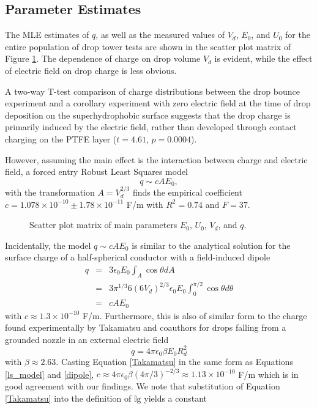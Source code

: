 \documentclass[aip,reprint, floatfix]{revtex4-1}
\begin{document}
\subsection{Parameter Estimates}
The MLE estimates of $q$, as well as the measured values of $V_d$, $E_0$, and $U_0$ for the entire population of drop tower tests are shown in the scatter plot matrix of Figure \ref{fig:scatter}. The dependence of charge on drop volume $V_d$ is evident, while the effect of electric field on drop charge is less obvious.

A two-way T-test comparison of charge distributions between the drop bounce experiment and a corollary experiment with zero electric field at the time of drop deposition on the superhydrophobic surface suggests that the drop charge is primarily induced by the electric field, rather than developed through contact charging on the PTFE layer ($t = 4.61$, $p = 0.0004$).

However, assuming the main effect is the interaction between charge and electric field, a forced entry Robust Least Squares model 
\begin{equation}
q \sim cAE_0,
\label{ls_model}
\end{equation} 
with the transformation $A = V_d^{2/3}$ finds the empirical coefficient $c=1.078 \times 10^{-10} \pm  1.78 \times 10^{-11}$ F/m with $R^2 = 0.74$ and $F=37$. 
\begin{figure}[h]
    \centering
    \resizebox{0.5\textwidth}{!}{}
    \caption{Scatter plot matrix of main parameters $E_0$, $U_0$, $V_d$, and $q$.\label{fig:scatter}}
\end{figure}

Incidentally, the model $q \sim cAE_0$ is similar to the analytical solution for the surface charge of a half-spherical conductor with a field-induced dipole \cite{david_j._griffiths_introduction_1999}
\begin{eqnarray}
q &=& 3 \epsilon_0 E_0 \int_A \cos \theta dA \nonumber \\
&=& 3 \pi^{1/3} 6 \left(6 V_d \right)^{2/3} \epsilon_0 E_0 \int^{\pi / 2}_{0} \!\!\!\!\! \cos \theta d\theta \nonumber \\
&=& c A E_0 \label{dipole}
\end{eqnarray}
with $c \approx 1.3 \times 10^{-10}$ F/m. Furthermore, this is also of similar form to the charge found experimentally by Takamatsu and coauthors for drops falling from a grounded nozzle in an external electric field \cite{takamatsu_theoretical_1981}
\begin{equation}
q = 4 \pi \epsilon_0 \beta E_0 R_d^2
\label{Takamatsu}
\end{equation}
with $\beta \approx 2.63$. Casting Equation \ref{Takamatsu} in the same form as Equations \ref{ls_model} and \ref{dipole}, $c \approx 4 \pi \epsilon_0 \beta (4 \pi/3)^{-2/3} \approx 1.13 \times 10^{-10}$ F/m which is in good agreement with our findings. We note that substitution of Equation \ref{Takamatsu} into the definition of $\mathbb{I}\mbox{g}$ yields a constant
\end{document}
